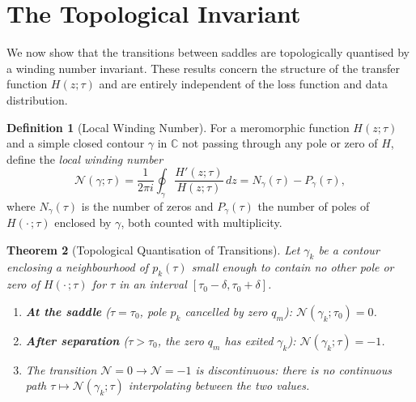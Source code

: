 \documentclass[11pt,a4paper]{article}
\newtheorem{theorem}{Theorem}[section]
\theoremstyle{definition}
\newtheorem{definition}[theorem]{Definition}
\newcommand{\C}{\mathbb{C}}
\newcommand{\cN}{\mathcal{N}}
\begin{document}
\section{The Topological Invariant}\label{sec:topology}

We now show that the transitions between saddles are topologically
quantised by a winding number invariant. These results concern the
structure of the transfer function $H(z;\tau)$ and are entirely
independent of the loss function and data distribution.

\begin{definition}[Local Winding Number]\label{def:winding}
For a meromorphic function $H(z;\tau)$ and a simple closed contour
$\gamma$ in $\C$ not passing through any pole or zero of $H$,
define the \emph{local winding number}
\begin{equation}\label{eq:winding}
  \cN(\gamma;\tau)
  = \frac{1}{2\pi i}\oint_{\gamma}
  \frac{H'(z;\tau)}{H(z;\tau)}\,dz
  = N_\gamma(\tau) - P_\gamma(\tau),
\end{equation}
where $N_\gamma(\tau)$ is the number of zeros and $P_\gamma(\tau)$
the number of poles of $H(\cdot\,;\tau)$ enclosed by $\gamma$,
both counted with multiplicity.
\end{definition}

\begin{theorem}[Topological Quantisation of Transitions]%
\label{thm:topological}
Let $\gamma_k$ be a contour enclosing a neighbourhood of
$p_k(\tau)$ small enough to contain no other pole or zero of
$H(\cdot\,;\tau)$ for $\tau$ in an interval $[\tau_0-\delta,
\tau_0+\delta]$.
\begin{enumerate}[label=(\roman*)]
  \item \textbf{At the saddle} ($\tau = \tau_0$, pole $p_k$
    cancelled by zero $q_m$):
    $\cN(\gamma_k;\tau_0) = 0$.
  \item \textbf{After separation} ($\tau > \tau_0$, the zero $q_m$
    has exited $\gamma_k$):
    $\cN(\gamma_k;\tau) = -1$.
  \item The transition $\cN = 0 \to \cN = -1$ is
    discontinuous: there is no continuous path
    $\tau \mapsto \cN(\gamma_k;\tau)$ interpolating between
    the two values.
\end{enumerate}
\end{theorem}
\end{document}

